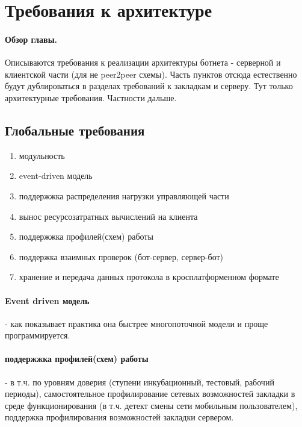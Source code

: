 \section{Требования к архитектуре}
\label{architecture}

\paragraph{Обзор главы.\\}
Описываются требования к реализации архитектуры ботнета -
серверной и клиентской части (для не peer2peer схемы).
Часть пунктов отсюда естественно будут дублироваться в разделах требований к
закладкам и серверу. Тут только архитектурные требования. Частности дальше.\\

\subsection{Глобальные требования}
\label{architecture_global}

\begin{enumerate}
\item{модульность}
\item{event-driven модель}
\item{поддержжка распределения нагрузки управляющей части}
\item{вынос ресурсозатратных вычислений на клиента}
\item{поддержжка профилей(схем) работы}
\item{поддержка взаимных проверок (бот-сервер, сервер-бот)}
\item{хранение и передача данных протокола в кросплатформенном формате}
\end{enumerate}

\paragraph{Event driven модель}- как показывает практика она быстрее многопоточной модели и проще программируется.

\paragraph{поддержжка профилей(схем) работы} - в т.ч. по уровням доверия (ступени инкубационный, тестовый, рабочий периоды), самостоятельное профилирование сетевых возможностей закладки в среде функционирования (в т.ч. детект
смены сети мобильным пользователем), поддержка профилирования возможностей закладки сервером.

